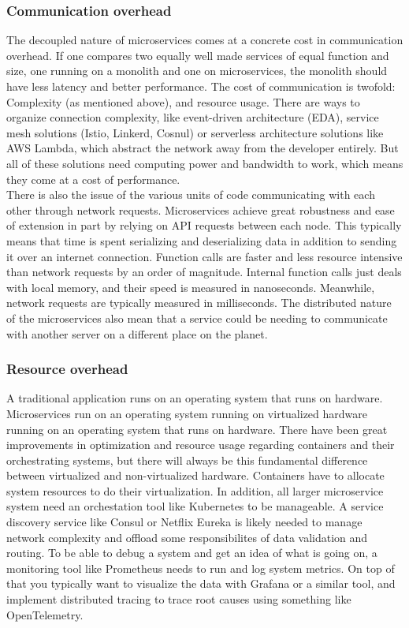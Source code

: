 \subsubsection{Communication overhead}
The decoupled nature of microservices comes at a concrete cost in communication overhead.
If one compares two equally well made services of equal function and size, one running on a monolith and one on microservices, the monolith should have less latency and better performance.
The cost of communication is twofold: Complexity (as mentioned above), and resource usage.
There are ways to organize connection complexity, like event-driven architecture (EDA), service mesh solutions (Istio, Linkerd, Cosnul) or serverless architecture solutions like AWS Lambda, which abstract the network away from the developer entirely.
But all of these solutions need computing power and bandwidth to work, which means they come at a cost of performance. \\
There is also the issue of the various units of code communicating with each other through network requests.
Microservices achieve great robustness and ease of extension in part by relying on API requests between each node.
This typically means that time is spent serializing and deserializing data in addition to sending it over an internet connection.
Function calls are faster and less resource intensive than network requests by an order of magnitude.
Internal function calls just deals with local memory, and their speed is measured in nanoseconds.
Meanwhile, network requests are typically measured in milliseconds.
The distributed nature of the microservices also mean that a service could be needing to communicate with another server on a different place on the planet.

\subsubsection*{Resource overhead}
A traditional application runs on an operating system that runs on hardware.
Microservices run on an operating system running on virtualized hardware running on an operating system that runs on hardware.
There have been great improvements in optimization and resource usage regarding containers and their orchestrating systems, but there will always be this fundamental difference between virtualized and non-virtualized hardware.
Containers have to allocate system resources to do their virtualization. In addition, all larger microservice system need an orchestation tool like Kubernetes to be manageable.
A service discovery service like Consul or Netflix Eureka is likely needed to manage network complexity and offload some responsibilites of data validation and routing.
To be able to debug a system and get an idea of what is going on, a monitoring tool like Prometheus needs to run and log system metrics. On top of that you typically want to visualize the data with Grafana or a similar tool, and implement distributed tracing to trace root causes using something like OpenTelemetry.

